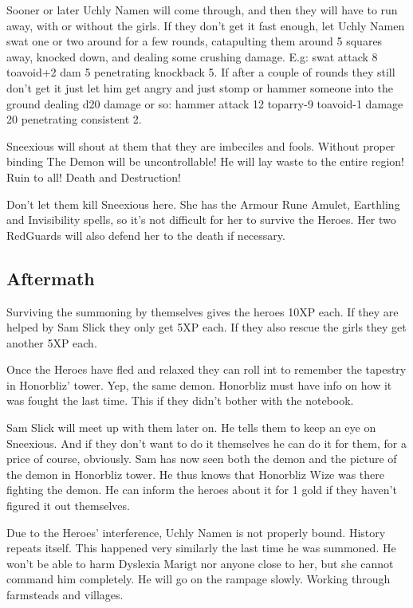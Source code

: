 \documentclass[11pt, twoside, titlepage, a4paper]{report}
\begin{document}
Sooner or later Uchly Namen will come through, and then they will have to run away, with or without the girls. If they don't get it fast enough, let Uchly Namen swat one or two around for a few rounds, catapulting them around 5 squares away, knocked down, and dealing some crushing damage. E.g: swat attack 8 toavoid+2 dam 5 penetrating knockback 5. If after a couple of rounds they still don't get it just let him get angry and just stomp or hammer someone into the ground dealing d20 damage or so: hammer attack 12 toparry-9 toavoid-1 damage 20 penetrating consistent 2.

Sneexious will shout at them that they are imbeciles and fools. Without proper binding The Demon will be uncontrollable! He will lay waste to the entire region! Ruin to all! Death and Destruction!

Don't let them kill Sneexious here. She has the Armour Rune Amulet, Earthling and Invisibility spells, so it's not difficult for her to survive the Heroes. Her two RedGuards will also defend her to the death if necessary.


\subsection*{Aftermath}
Surviving the summoning by themselves gives the heroes 10XP each. If they are helped by Sam Slick they only get 5XP each. If they also rescue the girls they get another 5XP each.

Once the Heroes have fled and relaxed they can roll int to remember the tapestry in Honorbliz' tower. Yep, the same demon. Honorbliz must have info on how it was fought the last time. This if they didn't bother with the notebook.

Sam Slick will meet up with them later on. He tells them to keep an eye on Sneexious. And if they don't want to do it themselves he can do it for them, for a price of course, obviously.
Sam has now seen both the demon and the picture of the demon in Honorbliz tower. He thus knows that Honorbliz Wize was there fighting the demon. He can inform the heroes about it for 1 gold if they haven't figured it out themselves.

Due to the Heroes' interference, Uchly Namen is not properly bound. History repeats itself. This happened very similarly the last time he was summoned.
He won't be able to harm Dyslexia Marigt nor anyone close to her, but she cannot command him completely.
He will go on the rampage slowly. Working through farmsteads and villages.
\end{document}
